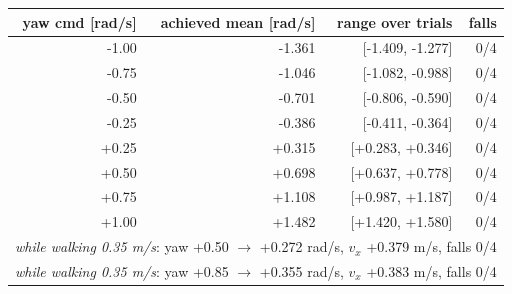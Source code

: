 \begin{tabular}{rrrr}\toprule
yaw cmd [rad/s] & achieved mean [rad/s] & range over trials & falls \\\midrule
-1.00 & -1.361 & [-1.409, -1.277] & 0/4 \\
-0.75 & -1.046 & [-1.082, -0.988] & 0/4 \\
-0.50 & -0.701 & [-0.806, -0.590] & 0/4 \\
-0.25 & -0.386 & [-0.411, -0.364] & 0/4 \\
+0.25 & +0.315 & [+0.283, +0.346] & 0/4 \\
+0.50 & +0.698 & [+0.637, +0.778] & 0/4 \\
+0.75 & +1.108 & [+0.987, +1.187] & 0/4 \\
+1.00 & +1.482 & [+1.420, +1.580] & 0/4 \\
\multicolumn{4}{l}{\emph{while walking 0.35 m/s}: yaw +0.50 $\to$ +0.272 rad/s, $v_x$ +0.379 m/s, falls 0/4} \\
\multicolumn{4}{l}{\emph{while walking 0.35 m/s}: yaw +0.85 $\to$ +0.355 rad/s, $v_x$ +0.383 m/s, falls 0/4} \\
\bottomrule\end{tabular}

